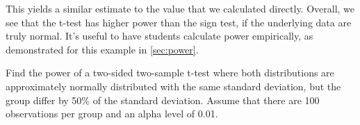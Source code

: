 This yields a similar estimate to the value that we calculated directly.  
Overall, we see that the t-test has higher power than the sign test, if the underlying
data are truly normal.  It's useful to have students calculate power empirically, 
as demonstrated for this example in \ref{sec:power}.

\begin{problem}
\label{prob:power1}


Find the power of a two-sided two-sample t-test where both distributions 
are approximately normally distributed with the same standard deviation, but the group differ by 50\% of the standard deviation.  Assume that there are 
100
observations per group and an alpha level of 0.01.

\end{problem}
\begin{solution}
\begin{knitrout}
\end{knitrout}

\end{solution}

